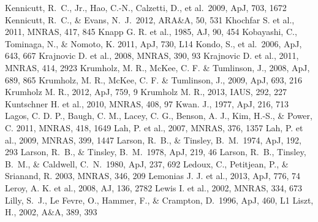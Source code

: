 \begin{thebibliography}{99}
\begin{multicols}{2}
{	Kennicutt, R.~C., Jr., Hao, C.-N., Calzetti, D., et al.\ 2009, ApJ, 703, 1672 
	Kennicutt, R.~C., \& Evans, N.~J.\ 2012, ARA\&A, 50, 531 
	Khochfar S. et al., 2011, MNRAS, 417, 845
	Knapp G. R. et al., 1985, AJ, 90, 454
   	Kobayashi, C., Tominaga, N., \& Nomoto, K. 2011, ApJ, 730, L14
   	Kondo, S., et al.\ 2006, ApJ, 643, 667
	Krajnovic D. et al., 2008, MNRAS, 390, 93
	Krajnovic D. et al., 2011, MNRAS, 414, 2923
	Krumholz, M. R., McKee, C. F. \& Tumlinson, J., 2008, ApJ, 689, 865
	Krumholz, M. R., McKee, C. F. \& Tumlinson, J., 2009, ApJ, 693, 216
	Krumholz M. R., 2012, ApJ, 759, 9
        Krumholz M. R., 2013, IAUS, 292, 227
	Kuntschner H. et al., 2010, MNRAS, 408, 97
	Kwan. J., 1977, ApJ, 216, 713
    	Lagos, C. D. P., Baugh, C. M., Lacey, C. G., Benson, A. J., Kim, H.-S.,
    \& Power, C. 2011, MNRAS, 418, 1649
	Lah, P. et al., 2007, MNRAS, 376, 1357
	Lah, P. et al., 2009, MNRAS, 399, 1447
	Larson, R.~B., \& Tinsley, B.~M.\ 1974, ApJ, 192, 293 
	Larson, R.~B., \& Tinsley, B.~M.\ 1978, ApJ, 219, 46 
	Larson, R.~B., Tinsley, B.~M., \& Caldwell, C.~N.\ 1980, ApJ, 237, 692 
	Ledoux, C., Petitjean, P., \& Srianand, R. 2003, MNRAS, 346, 209
	Lemonias J. J. et al., 2013, ApJ, 776, 74
	Leroy, A. K. et al., 2008, AJ, 136, 2782
	Lewis I. et al., 2002, MNRAS, 334, 673
	Lilly, S.~J., Le Fevre, O., Hammer, F., \& Crampton, D.\ 1996, ApJ, 460, L1
      Liszt, H., 2002, A\&A, 389, 393
}
\end{multicols}
\end{thebibliography}
